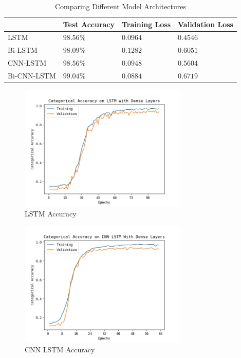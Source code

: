 \documentclass[journal]{IEEEtran}
\begin{document}
    \begin{table}[h!]
      \begin{center}
        \begin{tabular}{l|l|l|l} %
          & \textbf{Test Accuracy} & \textbf{Training Loss} & \textbf{Validation Loss}\\
          \hline
          LSTM        & $98.56\%$ & $0.0964$ & $0.4546$ \\
          Bi-LSTM     & $98.09\%$ & $0.1282$ & $0.6051$ \\
          CNN-LSTM    & $98.56\%$ & $0.0948$ & $0.5604$ \\
          Bi-CNN-LSTM & $99.04\%$ & $0.0884$ & $0.6719$ \\
        \end{tabular}
        \caption{Comparing Different Model Architectures}
        \label{tab:model_results}
      \end{center}
    \end{table}
  
    \begin{figure}[h]
      \centering
      \includegraphics[width=8cm]{figures/01-58-36Forward_LSTM With Dense Layers_accuracy.png}
      \caption{LSTM Accuracy}
      \label{fig:lstm_accuracy}
    \end{figure}

    \begin{figure}[h]
      \centering
      \includegraphics[width=8cm]{figures/02-07-24Forward_CNN LSTM With Dense Layers_accuracy.png}
      \caption{CNN LSTM Accuracy}
      \label{fig:cnn_accuracy}
    \end{figure}
\end{document}
